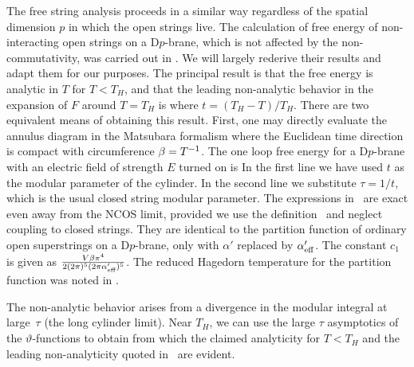 The free string analysis proceeds in a similar way regardless of the
spatial dimension $p$ in which the open strings live.
The calculation of free energy of non-interacting open strings on
a D$p$-brane, which is not affected by the non-commutativity,
was carried out in \cite{Eli}. We will largely rederive
their results and adapt them for our purposes. The principal
result is that
the free energy is analytic in $T$ for $T<T_H$, and that the leading
non-analytic behavior in the expansion of $F$ around $T=T_H$ is
 where $t = (T_H-T)/T_H$.  There are two equivalent means of obtaining
this result.  First, one may directly evaluate the annulus diagram in
the Matsubara formalism where the Euclidean time direction is compact with
circumference $\beta = T^{-1}$.
The one loop free energy for a D$p$-brane with an electric
field of strength $E$ turned on is \cite{Tseytlin}
 In the first line we have used $t$ as the modular parameter of the
cylinder.  In the second line we substitute $\tau = 1/t$, which is the
usual closed string modular parameter.  The expressions in \zncos\ are
exact even away from the NCOS limit, provided we use the definition
\apDef\ and neglect coupling to closed strings.  They are identical
to the partition function of ordinary open superstrings on a D$p$-brane,
only with $\alpha'$ replaced by $\alpha'_{\rm eff}$.  The constant
$c_1$ is given as ${ V \beta \pi^4 \over 2 (2 \pi)^5 (2 \pi \alpha'_{\rm
eff})^5}$.  The reduced Hagedorn temperature for the partition
function was noted in \cite{Fradkin}.

The non-analytic behavior arises from a divergence in the modular
integral at large~$\tau$ (the long cylinder limit).  Near
$T_H$, we can use the large $\tau$ asymptotics of the
$\vartheta$-functions to obtain
 from which the claimed analyticity for $T<T_H$ and the leading
non-analyticity quoted in \FBehave\ are evident.

